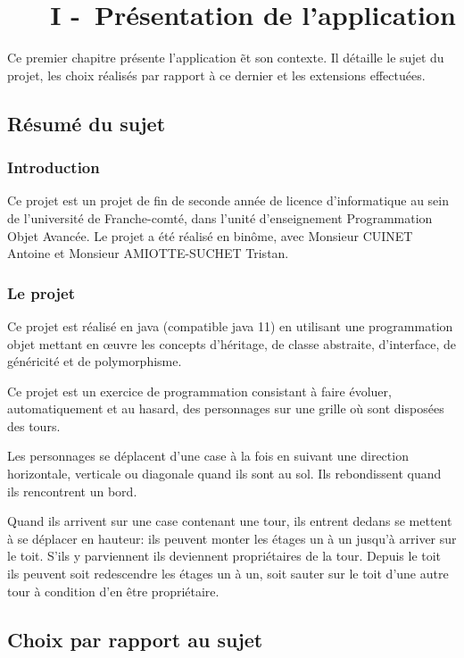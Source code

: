 \chapter[~~~PRÉSENTATION DE L'APPLICATION]{~~~I -~Présentation de l'application}%
\label{refDev1}%

Ce premier chapitre présente l'application \nom\~et son contexte. Il détaille le sujet du projet, les choix réalisés par rapport à ce dernier et les extensions effectuées.

\section{Résumé du sujet}
\subsection{Introduction}

Ce projet est un projet de fin de seconde année de licence d'informatique au sein de l'université de Franche-comté, dans l'unité d'enseignement Programmation Objet Avancée.
Le projet a été réalisé en binôme, avec Monsieur CUINET Antoine et Monsieur AMIOTTE-SUCHET Tristan. 

\subsection{Le projet}

Ce projet est réalisé en java (compatible java 11) en utilisant une programmation
objet mettant en œuvre les concepts d’héritage, de classe abstraite, d’interface, de généricité et de polymorphisme.
\bigskip

Ce projet est un exercice de programmation consistant à faire évoluer, automatiquement et au hasard, des personnages sur une grille où sont disposées des tours. 

Les personnages se déplacent d'une case à la fois en suivant une direction horizontale, verticale ou diagonale quand ils sont au sol. 
Ils rebondissent quand ils rencontrent un bord. 

Quand ils arrivent sur une case contenant une tour, ils entrent dedans se mettent à se déplacer en hauteur: ils peuvent monter les étages un à un jusqu'à arriver sur le toit. S'ils y parviennent ils deviennent propriétaires de la tour. 
Depuis le toit ils peuvent soit redescendre les étages un à un, soit sauter
sur le toit d'une autre tour à condition d'en être propriétaire.


\section{Choix par rapport au sujet}


